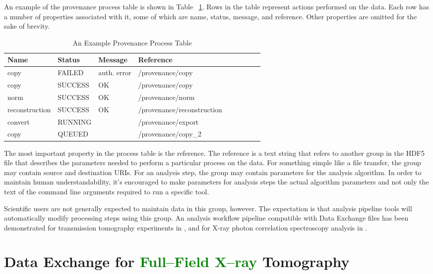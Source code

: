 \documentclass[pdf]{iucr}              %
\begin{document}
An example of the provenance process table is shown in Table ~\ref{table:provenance}. Rows in the table represent actions performed on the data. Each row has a number of properties associated with it, some of which are name, status, message, and reference. Other properties are omitted for the sake of brevity.

\begin{table}
\centering
\footnotesize
\caption{An Example Provenance Process Table}
\label{table:provenance}
\begin{tabular}{l l l l l l l l l }
\toprule
\bfseries Name & \bfseries Status & \bfseries Message & \bfseries Reference \\
\midrule
copy & FAILED & auth. error & /provenance/copy  \\
copy & SUCCESS & OK & /provenance/copy  \\
norm & SUCCESS & OK & /provenance/norm  \\
reconstruction & SUCCESS & OK & /provenance/reconstruction  \\
convert & RUNNING & & /provenance/export  \\
copy & QUEUED & & /provenance/copy\_2 \\
\bottomrule
\end{tabular}
\end{table}

The most important property in the process table is the reference. The reference is a text string that refers to another group in the HDF5 file that describes the parameters needed to perform a particular process on the data. For something simple like a file transfer, the group may contain source and destination URIs. For an analysis step, the group may contain parameters for the analysis algorithm. In order to maintain human understandability, it's encouraged to make parameters for analysis steps the actual algorithm parameters and not only the text of the command line arguments required to run a specific tool.

Scientific users are not generally expected to maintain data in this group, however. The expectation is that analysis pipeline tools will automatically modify processing steps using this group. An analysis workflow pipeline compatible with Data Exchange files has been demonstrated for transmission tomography experiments in \cite{schwarz_icalepcs_2013}, and for X-ray photon correlation spectroscopy analysis in \cite{khan_icalepcs_2013}.

\section{Data Exchange for \textcolor{green}{Full--Field X--ray} Tomography}
\end{document}
